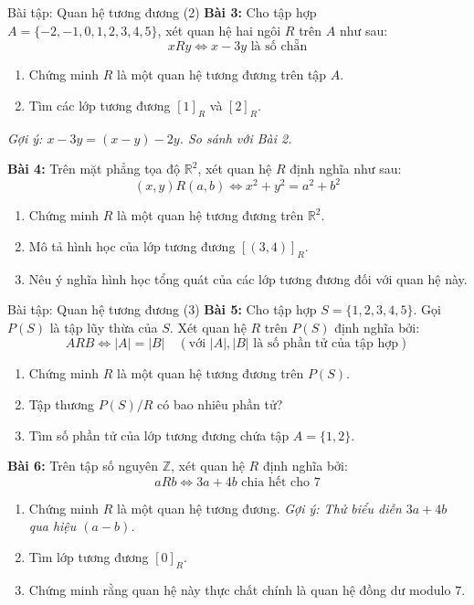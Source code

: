 \documentclass[12pt,a4paper]{article}
\begin{document}
\begin{baitap}{Bài tập: Quan hệ tương đương (2)}
\textbf{Bài 3:} Cho tập hợp $A = \{-2, -1, 0, 1, 2, 3, 4, 5\}$, xét quan hệ hai ngôi $R$ trên $A$ như sau:
\[
  xRy \iff x - 3y \text{ là số chẵn}
\]
\begin{enumerate}[label=\alph*)]
  \item Chứng minh $R$ là một quan hệ tương đương trên tập $A$.
  \item Tìm các lớp tương đương $[1]_R$ và $[2]_R$.
\end{enumerate}
\textit{Gợi ý: $x - 3y = (x - y) - 2y$. So sánh với Bài 2.}

\textbf{Bài 4:} Trên mặt phẳng tọa độ $\mathbb{R}^2$, xét quan hệ $R$ định nghĩa như sau:
\[
  (x, y)R(a, b) \iff x^2 + y^2 = a^2 + b^2
\]
\begin{enumerate}[label=\alph*)]
  \item Chứng minh $R$ là một quan hệ tương đương trên $\mathbb{R}^2$.
  \item Mô tả hình học của lớp tương đương $[(3, 4)]_R$.
  \item Nêu ý nghĩa hình học tổng quát của các lớp tương đương đối với quan hệ này.
\end{enumerate}
\end{baitap}

\begin{baitap}{Bài tập: Quan hệ tương đương (3)}
\textbf{Bài 5:} Cho tập hợp $S = \{1, 2, 3, 4, 5\}$. Gọi $P(S)$ là tập lũy thừa của $S$. Xét quan hệ $R$ trên $P(S)$ định nghĩa bởi:
\[
  ARB \iff |A| = |B| \quad (\text{với } |A|, |B| \text{ là số phần tử của tập hợp})
\]
\begin{enumerate}[label=\alph*)]
  \item Chứng minh $R$ là một quan hệ tương đương trên $P(S)$.
  \item Tập thương $P(S)/R$ có bao nhiêu phần tử?
  \item Tìm số phần tử của lớp tương đương chứa tập $A = \{1, 2\}$.
\end{enumerate}

\textbf{Bài 6:} Trên tập số nguyên $\mathbb{Z}$, xét quan hệ $R$ định nghĩa bởi:
\[
  aRb \iff 3a + 4b \text{ chia hết cho } 7
\]
\begin{enumerate}[label=\alph*)]
  \item Chứng minh $R$ là một quan hệ tương đương. \textit{Gợi ý: Thử biểu diễn $3a + 4b$ qua hiệu $(a - b)$.}
  \item Tìm lớp tương đương $[0]_R$.
  \item Chứng minh rằng quan hệ này thực chất chính là quan hệ đồng dư modulo $7$.
\end{enumerate}
\end{baitap}
\end{document}
